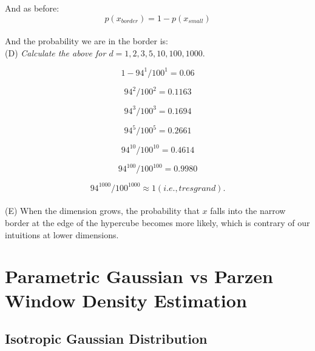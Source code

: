 \documentclass{amsart}
\theoremstyle{definition}
\theoremstyle{remark}
\numberwithin{equation}{section}
\begin{document}
And as before: \\

\begin{equation}
    p(x_{border}) = 1 - p(x_{small})
\end{equation} \\

And the probability we are in the border is: \\

(D) \textit{Calculate the above for $d = {1, 2, 3, 5, 10, 100, 1000}$}.

\begin{equation}
    1- 94^1 / 100^1 = 0.06
\end{equation}

\begin{equation}
    94^2 / 100^2 = 0.1163
\end{equation}

\begin{equation}
    94^3 / 100^3 = 0.1694
\end{equation}

\begin{equation}
    94^5 / 100^5 = 0.2661
\end{equation}

\begin{equation}
    94^{10} / 100^{10} = 0.4614
\end{equation}

\begin{equation}
    94^{100} / 100^{100} = 0.9980
\end{equation}

\begin{equation}
    94^{1000} / 100^{1000} \approx 1 (i.e., tres grand).
\end{equation} \\

(E) When the dimension grows, the probability that $x$ falls into the narrow border at the edge of the hypercube becomes more likely, which is contrary of our intuitions
at lower dimensions. 

\section{Parametric Gaussian vs Parzen Window Density Estimation}

\subsection{Isotropic Gaussian Distribution} \\
\end{document}
